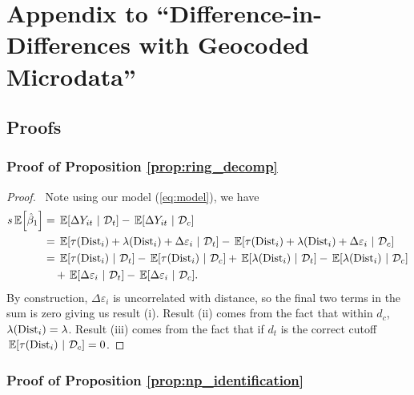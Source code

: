 \chapter{Appendix to ``Difference-in-Differences with Geocoded Microdata''}

\section{Proofs}\label{sec:geocoded-proofs}

\subsection{Proof of Proposition \ref{prop:ring_decomp}}

\begin{proof}
  \ Note using our model (\ref{eq:model}), we have 
  \begin{align*}s
    \expec{\hat{\beta}_1} &= \expec{\Delta Y_{it}}{\mathcal{D}_t} - \expec{\Delta Y_{it}}{\mathcal{D}_c} \\
    &= \expec{\tau(\dist_i) + \lambda(\dist_i) + \Delta \varepsilon_{i}}{\mathcal{D}_t} - \expec{\tau(\dist_i) + \lambda(\dist_i) + \Delta \varepsilon_{i}}{\mathcal{D}_c} \\ 
    &= \expec{\tau(\dist_i)}{\mathcal{D}_t} - \expec{\tau(\dist_i)}{\mathcal{D}_c} + \expec{\lambda(\dist_i)}{\mathcal{D}_t} - \expec{\lambda(\dist_i)}{\mathcal{D}_c} \\ 
    &\quad + \expec{\Delta\varepsilon_i}{\mathcal{D}_t} - \expec{\Delta\varepsilon_i}{\mathcal{D}_c}.
  \end{align*}
  By construction, $\Delta \varepsilon_i$ is uncorrelated with distance, so the final two terms in the sum is zero giving us result (i). Result (ii) comes from the fact that within $d_c$, $\lambda(\text{Dist}_i) = \lambda$. Result (iii) comes from the fact that if $d_t$ is the correct cutoff $\expec{\tau(\dist_i)}{\mathcal{D}_c} = 0$.
\end{proof}

\subsection{Proof of Proposition \ref{prop:np_identification}}

